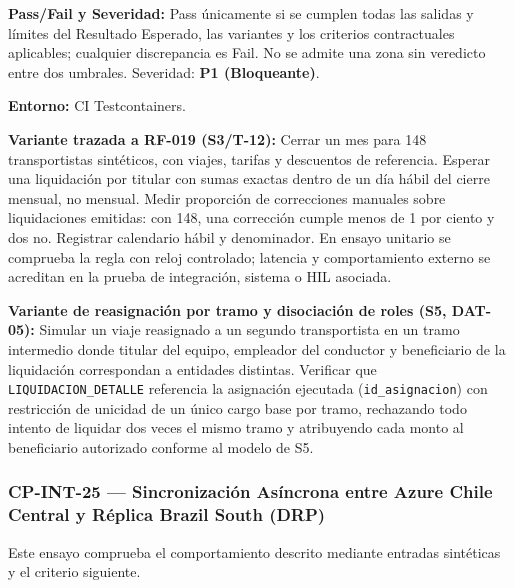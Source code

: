 \par\noindent\textbf{Pass/Fail y Severidad:} Pass únicamente si se cumplen todas las salidas y límites del Resultado Esperado, las variantes y los criterios contractuales aplicables; cualquier discrepancia es Fail. No se admite una zona sin veredicto entre dos umbrales. Severidad: \textbf{P1 (Bloqueante)}.\par
\par\noindent\textbf{Entorno:} CI Testcontainers.\par







\par\noindent\textbf{Variante trazada a RF-019 (S3/T-12):} Cerrar un mes para 148 transportistas sintéticos, con viajes, tarifas y descuentos de referencia. Esperar una liquidación por titular con sumas exactas dentro de un día hábil del cierre mensual, no mensual. Medir proporción de correcciones manuales sobre liquidaciones emitidas: con 148, una corrección cumple menos de 1 por ciento y dos no. Registrar calendario hábil y denominador. En ensayo unitario se comprueba la regla con reloj controlado; latencia y comportamiento externo se acreditan en la prueba de integración, sistema o HIL asociada.\par

\par\noindent\textbf{Variante de reasignación por tramo y disociación de roles (S5, DAT-05):} Simular un viaje reasignado a un segundo transportista en un tramo intermedio donde titular del equipo, empleador del conductor y beneficiario de la liquidación correspondan a entidades distintas. Verificar que \texttt{LIQUIDACION\_DETALLE} referencia la asignación ejecutada (\texttt{id\_asignacion}) con restricción de unicidad de un único cargo base por tramo, rechazando todo intento de liquidar dos veces el mismo tramo y atribuyendo cada monto al beneficiario autorizado conforme al modelo de S5.\par
\subsubsection*{CP-INT-25 — Sincronización Asíncrona entre Azure Chile Central y Réplica Brazil South (DRP)}\label{sec:9-cp-int-25}
Este ensayo comprueba el comportamiento descrito mediante entradas sintéticas y el criterio siguiente.

